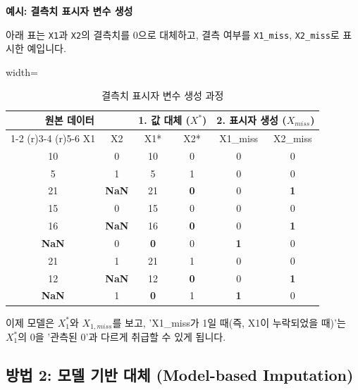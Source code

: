 \documentclass[11pt,a4paper]{book}
\theoremstyle{definition}
\begin{document}
\begin{examplebox}[title={예제}]
    \textbf{예시: 결측치 표시자 변수 생성}

    아래 표는 \texttt{X1}과 \texttt{X2}의 결측치를 0으로 대체하고, 결측 여부를 \texttt{X1\_miss}, \texttt{X2\_miss}로 표시한 예입니다.
    \begin{table}[h!]
        \centering
        \begin{adjustbox}{width=\textwidth}
            \begin{tabular}{@{}cc|cc|cc@{}}
                \toprule
                \multicolumn{2}{c}{원본 데이터} & \multicolumn{2}{c}{1. 값 대체 (\(X^*\))} & \multicolumn{2}{c}{2. 표시자 생성 (\(X_{miss}\))} \\
                \cmidrule(r){1-2} \cmidrule(r){3-4} \cmidrule(r){5-6}
                X1 & X2 & X1* & X2* & X1\_miss & X2\_miss \\
                \midrule
                10 & 0 & 10 & 0 & 0 & 0 \\
                5 & 1 & 5 & 1 & 0 & 0 \\
                21 & \textbf{NaN} & 21 & \textbf{0} & 0 & \textbf{1} \\
                15 & 0 & 15 & 0 & 0 & 0 \\
                16 & \textbf{NaN} & 16 & \textbf{0} & 0 & \textbf{1} \\
                \textbf{NaN} & 0 & \textbf{0} & 0 & \textbf{1} & 0 \\
                21 & 1 & 21 & 1 & 0 & 0 \\
                12 & \textbf{NaN} & 12 & \textbf{0} & 0 & \textbf{1} \\
                \textbf{NaN} & 1 & \textbf{0} & 1 & \textbf{1} & 0 \\
                \bottomrule
            \end{tabular}
        \end{adjustbox}
        \caption{결측치 표시자 변수 생성 과정}
        \label{tab:indicator}
    \end{table}

    이제 모델은 \(X_1^*\)와 \(X_{1,miss}\)를 보고, 'X1\_miss가 1일 때(즉, X1이 누락되었을 때)'는 \(X_1^*\)의 0을 '관측된 0'과 다르게 취급할 수 있게 됩니다.
\end{examplebox}

\subsection{방법 2: 모델 기반 대체 (Model-based Imputation)}
\end{document}
